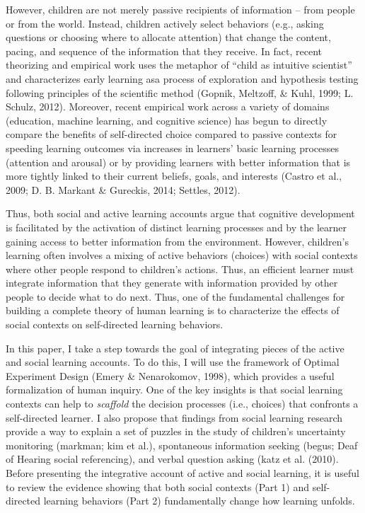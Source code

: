 \documentclass[english,man]{apa6}
\theoremstyle{definition}
\theoremstyle{definition}
\theoremstyle{definition}
\theoremstyle{remark}
\begin{document}
However, children are not merely passive recipients of information --
from people or from the world. Instead, children actively select
behaviors (e.g., asking questions or choosing where to allocate
attention) that change the content, pacing, and sequence of the
information that they receive. In fact, recent theorizing and empirical
work uses the metaphor of \enquote{child as intuitive scientist} and
characterizes early learning asa process of exploration and hypothesis
testing following principles of the scientific method (Gopnik, Meltzoff,
\& Kuhl, 1999; L. Schulz, 2012). Moreover, recent empirical work across
a variety of domains (education, machine learning, and cognitive
science) has begun to directly compare the benefits of self-directed
choice compared to passive contexts for speeding learning outcomes via
increases in learners' basic learning processes (attention and arousal)
or by providing learners with better information that is more tightly
linked to their current beliefs, goals, and interests (Castro et al.,
2009; D. B. Markant \& Gureckis, 2014; Settles, 2012).

Thus, both social and active learning accounts argue that cognitive
development is facilitated by the activation of distinct learning
processes and by the learner gaining access to better information from
the environment. However, children's learning often involves a mixing of
active behaviors (choices) with social contexts where other people
respond to children's actions. Thus, an efficient learner must integrate
information that they generate with information provided by other people
to decide what to do next. Thus, one of the fundamental challenges for
building a complete theory of human learning is to characterize the
effects of social contexts on self-directed learning behaviors.

In this paper, I take a step towards the goal of integrating pieces of
the active and social learning accounts. To do this, I will use the
framework of Optimal Experiment Design (Emery \& Nenarokomov, 1998),
which provides a useful formalization of human inquiry. One of the key
insights is that social learning contexts can help to \emph{scaffold}
the decision processes (i.e., choices) that confronts a self-directed
learner. I also propose that findings from social learning research
provide a way to explain a set of puzzles in the study of children's
uncertainty monitoring (markman; kim et al.), spontaneous information
seeking (begus; Deaf of Hearing social referencing), and verbal question
asking (katz et al. (2010). Before presenting the integrative account of
active and social learning, it is useful to review the evidence showing
that both social contexts (Part 1) and self-directed learning behaviors
(Part 2) fundamentally change how learning unfolds.
\end{document}
